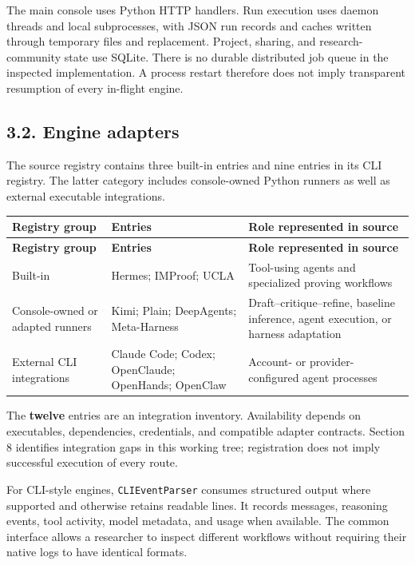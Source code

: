 \documentclass[11pt,a4paper]{article}
\begin{document}
The main console uses Python HTTP handlers. Run execution uses daemon threads and local subprocesses, with JSON run records and caches written through temporary files and replacement. Project, sharing, and research-community state use SQLite. There is no durable distributed job queue in the inspected implementation. A process restart therefore does not imply transparent resumption of every in-flight engine.

\subsection*{3.2. Engine adapters}

The source registry contains three built-in entries and nine entries in its CLI registry. The latter category includes console-owned Python runners as well as external executable integrations.

\begingroup\small
\setlength{\tabcolsep}{4pt}
\begin{longtable}{>{\raggedright\arraybackslash}p{0.23\dimexpr\linewidth-6\tabcolsep\relax}>{\raggedright\arraybackslash}p{0.38\dimexpr\linewidth-6\tabcolsep\relax}>{\raggedright\arraybackslash}p{0.39\dimexpr\linewidth-6\tabcolsep\relax}}
\toprule
\textbf{Registry group} & \textbf{Entries} & \textbf{Role represented in source} \\
\midrule\endfirsthead
\toprule
\textbf{Registry group} & \textbf{Entries} & \textbf{Role represented in source} \\
\midrule\endhead
\bottomrule\endfoot
Built-in & Hermes; IMProof; UCLA & Tool-using agents and specialized proving workflows \\
Console-owned or adapted runners & Kimi; Plain; DeepAgents; Meta-Harness & Draft--critique--refine, baseline inference, agent execution, or harness adaptation \\
External CLI integrations & Claude Code; Codex; OpenClaude; OpenHands; OpenClaw & Account- or provider-configured agent processes \\
\end{longtable}
\endgroup

The \textbf{twelve} entries are an integration inventory. Availability depends on executables, dependencies, credentials, and compatible adapter contracts. Section 8 identifies integration gaps in this working tree; registration does not imply successful execution of every route.

For CLI-style engines, \nolinkurl{CLIEventParser} consumes structured output where supported and otherwise retains readable lines. It records messages, reasoning events, tool activity, model metadata, and usage when available. The common interface allows a researcher to inspect different workflows without requiring their native logs to have identical formats.
\end{document}
